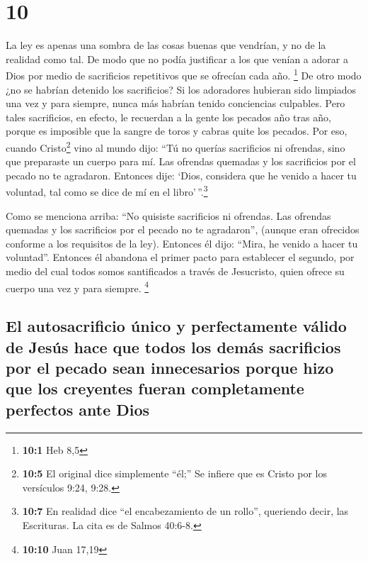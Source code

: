 \hypertarget{section-9}{%
\section{10}\label{section-9}}

 La ley es apenas una sombra de las cosas buenas que
vendrían, y no de la realidad como tal. De modo que no podía justificar
a los que venían a adorar a Dios por medio de sacrificios repetitivos
que se ofrecían cada año. \footnote{\textbf{10:1} Heb 8,5}
 De otro modo ¿no se habrían detenido los sacrificios? Si
los adoradores hubieran sido limpiados una vez y para siempre, nunca más
habrían tenido conciencias culpables.  Pero tales
sacrificios, en efecto, le recuerdan a la gente los pecados año tras
año,  porque es imposible que la sangre de toros y cabras
quite los pecados.  Por eso, cuando Cristo\footnote{\textbf{10:5}
  El original dice simplemente ``él;'' Se infiere que es Cristo por los
  versículos 9:24, 9:28.} vino al mundo dijo: ``Tú no querías
sacrificios ni ofrendas, sino que preparaste un cuerpo para mí.
 Las ofrendas quemadas y los sacrificios por el pecado no
te agradaron.  Entonces dije: `Dios, considera que he
venido a hacer tu voluntad, tal como se dice de mí en el
libro'\,''.\footnote{\textbf{10:7} En realidad dice ``el encabezamiento
  de un rollo'', queriendo decir, las Escrituras. La cita es de Salmos
  40:6-8.}

 Como se menciona arriba: ``No quisiste sacrificios ni
ofrendas. Las ofrendas quemadas y los sacrificios por el pecado no te
agradaron'', (aunque eran ofrecidos conforme a los requisitos de la
ley).  Entonces él dijo: ``Mira, he venido a hacer tu
voluntad''. Entonces él abandona el primer pacto para establecer el
segundo,  por medio del cual todos somos santificados a
través de Jesucristo, quien ofrece su cuerpo una vez y para siempre.
\footnote{\textbf{10:10} Juan 17,19}

\hypertarget{el-autosacrificio-uxfanico-y-perfectamente-vuxe1lido-de-jesuxfas-hace-que-todos-los-demuxe1s-sacrificios-por-el-pecado-sean-innecesarios-porque-hizo-que-los-creyentes-fueran-completamente-perfectos-ante-dios}{%
\subsection{El autosacrificio único y perfectamente válido de Jesús hace
que todos los demás sacrificios por el pecado sean innecesarios porque
hizo que los creyentes fueran completamente perfectos ante
Dios}\label{el-autosacrificio-uxfanico-y-perfectamente-vuxe1lido-de-jesuxfas-hace-que-todos-los-demuxe1s-sacrificios-por-el-pecado-sean-innecesarios-porque-hizo-que-los-creyentes-fueran-completamente-perfectos-ante-dios}}

